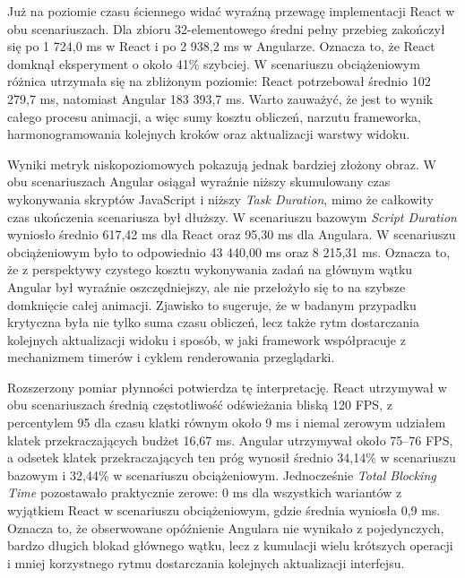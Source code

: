 \documentclass[12pt,openright,twoside]{report}
\begin{document}
Już na poziomie czasu ściennego widać wyraźną przewagę implementacji React w obu scenariuszach. Dla zbioru 32-elementowego średni pełny przebieg zakończył się po 1 724,0 ms w React i po 2 938,2 ms w Angularze. Oznacza to, że React domknął eksperyment o około 41\% szybciej. W scenariuszu obciążeniowym różnica utrzymała się na zbliżonym poziomie: React potrzebował średnio 102 279,7 ms, natomiast Angular 183 393,7 ms. Warto zauważyć, że jest to wynik całego procesu animacji, a więc sumy kosztu obliczeń, narzutu frameworka, harmonogramowania kolejnych kroków oraz aktualizacji warstwy widoku.

Wyniki metryk niskopoziomowych pokazują jednak bardziej złożony obraz. W obu scenariuszach Angular osiągał wyraźnie niższy skumulowany czas wykonywania skryptów JavaScript i niższy \textit{Task Duration}, mimo że całkowity czas ukończenia scenariusza był dłuższy. W scenariuszu bazowym \textit{Script Duration} wyniosło średnio 617,42 ms dla React oraz 95,30 ms dla Angulara. W scenariuszu obciążeniowym było to odpowiednio 43 440,00 ms oraz 8 215,31 ms. Oznacza to, że z perspektywy czystego kosztu wykonywania zadań na głównym wątku Angular był wyraźnie oszczędniejszy, ale nie przełożyło się to na szybsze domknięcie całej animacji. Zjawisko to sugeruje, że w badanym przypadku krytyczna była nie tylko suma czasu obliczeń, lecz także rytm dostarczania kolejnych aktualizacji widoku i sposób, w jaki framework współpracuje z mechanizmem timerów i cyklem renderowania przeglądarki.

Rozszerzony pomiar płynności potwierdza tę interpretację. React utrzymywał w obu scenariuszach średnią częstotliwość odświeżania bliską 120 FPS, z percentylem 95 dla czasu klatki równym około 9 ms i niemal zerowym udziałem klatek przekraczających budżet 16,67 ms. Angular utrzymywał około 75--76 FPS, a odsetek klatek przekraczających ten próg wynosił średnio 34,14\% w scenariuszu bazowym i 32,44\% w scenariuszu obciążeniowym. Jednocześnie \textit{Total Blocking Time} pozostawało praktycznie zerowe: 0 ms dla wszystkich wariantów z wyjątkiem React w scenariuszu obciążeniowym, gdzie średnia wyniosła 0,9 ms. Oznacza to, że obserwowane opóźnienie Angulara nie wynikało z pojedynczych, bardzo długich blokad głównego wątku, lecz z kumulacji wielu krótszych operacji i mniej korzystnego rytmu dostarczania kolejnych aktualizacji interfejsu.
\end{document}

